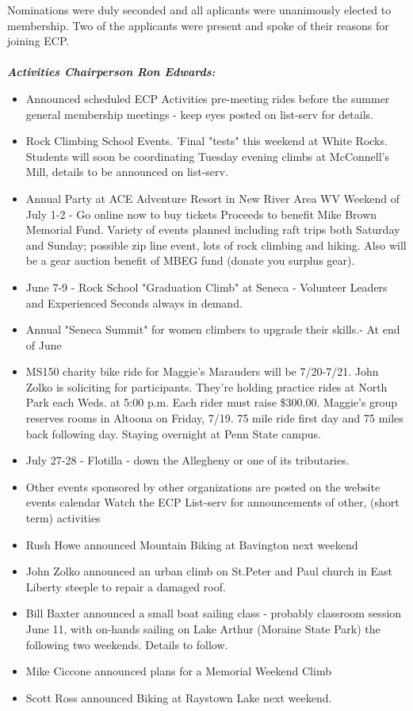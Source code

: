\documentclass[10pt,a4paper]{article}
\begin{document}
\begin{multicols}{2}
Nominations were duly seconded and all aplicants were unanimously elected to membership. Two of the applicants were present and spoke of their reasons for joining ECP.\\
\\
\textit{\textbf{Activities Chairperson Ron Edwards: }} 
\begin{itemize}
\item Announced scheduled ECP Activities pre-meeting rides before the summer general membership meetings - keep eyes posted on list-serv for details.
\item Rock Climbing School Events.  'Final "tests" this weekend at White Rocks. Students will soon be coordinating Tuesday evening climbs at McConnell's Mill,   details to be announced on list-serv.
\item Annual Party at ACE Adventure Resort in New River Area WV  Weekend of July 1-2 - Go online now to buy tickets  Proceeds to benefit Mike Brown Memorial Fund. Variety of events planned including raft trips both Saturday and Sunday; possible zip line event, lots of rock climbing and hiking. Also will be a gear auction benefit of MBEG fund
(donate you surplus gear).
\item June 7-9 - Rock School "Graduation Climb" at Seneca - Volunteer Leaders and Experienced Seconds always in demand.
\item Annual "Seneca Summit" for women climbers to upgrade their skills.- At end of June
\item MS150 charity bike ride for Maggie's Marauders will be 7/20-7/21.  John Zolko is soliciting for participants. They're holding practice rides at North Park each Weds. at 5:00 p.m. Each rider must raise \$300.00. Maggie's group reserves rooms in Altoona on Friday, 7/19.  75 mile ride first day and 75 miles back following day. Staying overnight at Penn State campus.
\item July 27-28 - Flotilla - down the Allegheny or one of its tributaries.
\item Other events sponsored by other organizations are posted on the website events calendar
Watch the ECP List-serv for announcements of other, (short term) activities
\item Rush Howe announced  Mountain Biking at Bavington next weekend
\item John Zolko announced an urban climb on St.Peter and Paul church in East Liberty steeple to repair a damaged roof.
\item Bill Baxter announced a small boat sailing class -  probably classroom session June 11, with on-hands sailing on Lake Arthur  (Moraine State Park) the following two weekends. Details to follow.
\item Mike Ciccone announced plans for a Memorial Weekend Climb
\item Scott Ross announced Biking at Raystown Lake next weekend.
\end{itemize}


\end{multicols}
\end{document}
